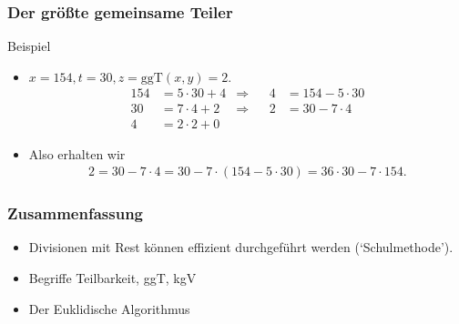 \documentclass{beamer}
\newcommand{\ggt}{\mathrm{ggT}}
\renewcommand{\oe}{\"o}
\newcommand{\ue}{\"u}
\begin{document}
\begin{frame}\frametitle{Der gr\oe\ss te gemeinsame Teiler}
	\begin{block}{Beispiel}
		\begin{itemize}
			\item $x=154,t=30,z=\ggt(x,y)=2$.
				\begin{align*}
					154&=5\cdot 30+4&\Rightarrow&&4&=154-5\cdot 30\\
					30&=7\cdot 4+2&\Rightarrow&&2&=30-7\cdot 4\\
					4&=2\cdot 2+0
				\end{align*}
			\item Also erhalten wir
				\begin{align*}
					2=30-7\cdot 4=30-7\cdot(154-5\cdot30)=36\cdot30-7\cdot 154.
				\end{align*}
		\end{itemize}
	\end{block}
\end{frame}

\begin{frame}\frametitle{Zusammenfassung}
\begin{itemize}
	\item Divisionen mit Rest k\oe nnen effizient durchgef\ue hrt werden (`Schulmethode').
	\item Begriffe Teilbarkeit, ggT, kgV
	\item Der Euklidische Algorithmus
\end{itemize}
\end{frame}
\end{document}

